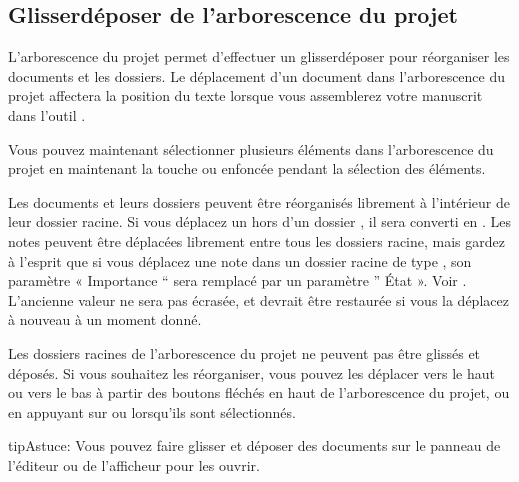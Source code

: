 \documentclass[a4paper,11pt,french]{sphinxmanual}
\begin{document}
\subsection{Glisser\sphinxhyphen{}déposer de l’arborescence du projet}
\label{\detokenize{usage_project:project-tree-drag-drop}}\label{\detokenize{usage_project:a-ui-tree-dnd}}
\sphinxAtStartPar
L’arborescence du projet permet d’effectuer un glisser\sphinxhyphen{}déposer pour réorganiser les documents et les dossiers. Le déplacement d’un document dans l’arborescence du projet affectera la position du texte lorsque vous assemblerez votre manuscrit dans l’outil .

\sphinxAtStartPar
{}Vous pouvez maintenant sélectionner plusieurs éléments dans l’arborescence du projet en maintenant la touche  ou  enfoncée pendant la sélection des éléments.

\sphinxAtStartPar
Les documents et leurs dossiers peuvent être réorganisés librement à l’intérieur de leur dossier racine. Si vous déplacez un  hors d’un dossier , il sera converti en . Les notes peuvent être déplacées librement entre tous les dossiers racine, mais gardez à l’esprit que si vous déplacez une note dans un dossier racine de type , son paramètre « Importance “ sera remplacé par un paramètre ” État ». Voir {\hyperref[\detokenize{usage_project:a-ui-tree-status}]{}}. L’ancienne valeur ne sera pas écrasée, et devrait être restaurée si vous la déplacez à nouveau à un moment donné.

\sphinxAtStartPar
Les dossiers racines de l’arborescence du projet ne peuvent pas être glissés et déposés. Si vous souhaitez les réorganiser, vous pouvez les déplacer vers le haut ou vers le bas à partir des boutons fléchés en haut de l’arborescence du projet, ou en appuyant sur  ou  lorsqu’ils sont sélectionnés.

\begin{sphinxadmonition}{tip}{Astuce:}
\sphinxAtStartPar
Vous pouvez faire glisser et déposer des documents sur le panneau de l’éditeur ou de l’afficheur pour les ouvrir.
\end{sphinxadmonition}
\end{document}
